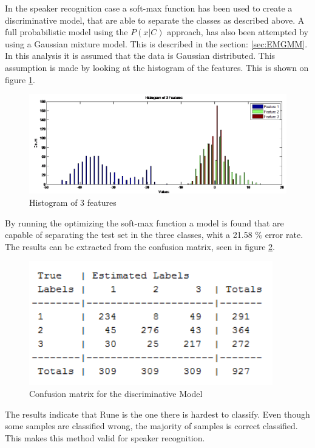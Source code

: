 In the speaker recognition case a soft-max function has been used to create a discriminative model, that are able to separate the classes as described above. A full probabilistic model using the $P(x|C)$ approach, has also been attempted by using a Gaussian mixture model. This is described in the section: \ref{sec:EMGMM}. In this analysis it is assumed that the data is Gaussian distributed. This assumption is made by looking at the histogram of the features. This is shown on figure \ref{fig:featurehist}.

\begin{figure}[H]
\centering
\includegraphics[scale=0.6]{billeder/histoffeature}
\caption{Histogram of 3 features}
\label{fig:featurehist}
\end{figure}

By running the optimizing the soft-max function a model is found that are capable of separating the test set in the three classes, whit a 21.58 \% error rate. The results can be extracted from the confusion matrix, seen in figure \ref{fig:conmatprob}. 

\begin{figure}[H]
\centering
\includegraphics[scale=0.8]{billeder/conmatprop}
\caption{Confusion matrix for the discriminative Model }
\label{fig:conmatprob}
\end{figure}

The results indicate that Rune is the one there is hardest to classify. Even though some samples are classified wrong, the majority of samples is correct classified. This makes this method valid for speaker recognition. \\

